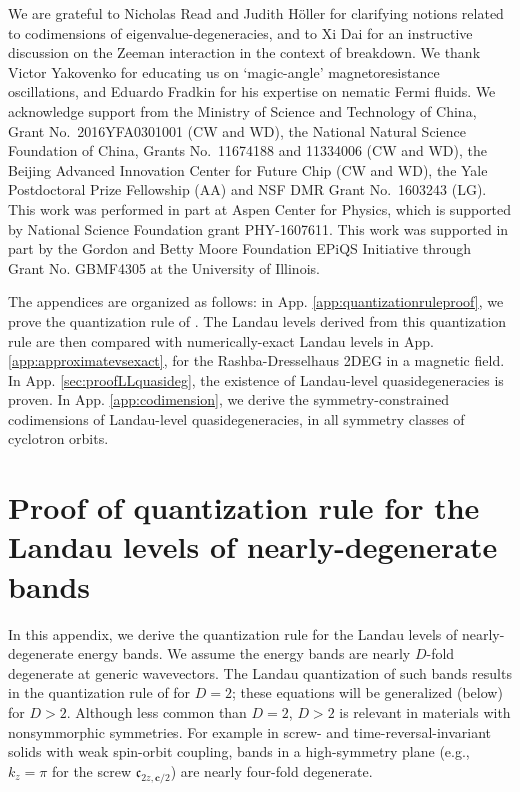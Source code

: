 \documentclass[aps, showpacs, twocolumn, notitlepage, superscriptaddress]{revtex4-1}
\begin{document}
\begin{acknowledgments}

We are grateful to Nicholas Read and Judith H\"oller for clarifying notions related to codimensions of eigenvalue-degeneracies, and to Xi Dai for an instructive discussion on the Zeeman interaction in the context of breakdown. We thank Victor Yakovenko for  educating us on `magic-angle' magnetoresistance oscillations, and  Eduardo Fradkin for his expertise on nematic Fermi fluids.  We acknowledge support from the Ministry of Science and Technology of China, Grant No.\ 2016YFA0301001 (CW and WD), the National Natural Science Foundation of China, Grants No.\ 11674188 and 11334006 (CW and WD), the Beijing Advanced Innovation Center for Future Chip (CW and WD), the Yale Postdoctoral Prize Fellowship (AA) and NSF DMR Grant No.\ 1603243 (LG). This work was performed in part at Aspen Center for Physics, which is supported by National Science Foundation grant PHY-1607611. This work was supported in part by the Gordon and Betty Moore Foundation EPiQS Initiative through Grant No. GBMF4305 at the University of Illinois.\\
\end{acknowledgments}


\appendix

The appendices are organized as follows: in App. \ref{app:quantizationruleproof}, we prove the quantization rule of . The Landau levels derived from this quantization rule are then compared with numerically-exact Landau levels in App. \ref{app:approximatevsexact}, for the Rashba-Dresselhaus 2DEG in a magnetic field.  In App. \ref{sec:proofLLquasideg}, the existence of Landau-level quasidegeneracies is proven. In App. \ref{app:codimension}, we derive the symmetry-constrained codimensions of Landau-level quasidegeneracies, in all symmetry classes of cyclotron orbits. 




\section{Proof of quantization rule for the Landau levels of nearly-degenerate bands \label{app:quantizationruleproof}}

In this appendix, we derive the quantization rule for the Landau levels of nearly-degenerate energy bands. We assume the energy bands are nearly $D$-fold degenerate at generic wavevectors. The Landau quantization of such bands results in the quantization rule of   for $D=2$; these equations will be generalized (below) for $D>2$. Although less common than $D=2$, $D>2$ is relevant in  materials with nonsymmorphic symmetries. For example in screw- and time-reversal-invariant solids with weak spin-orbit coupling, bands in a high-symmetry plane (e.g., $k_z=\pi$ for the screw $\mathfrak{c}_{2z,\boldsymbol{c}/2}$)  are nearly four-fold degenerate.
\end{document}
